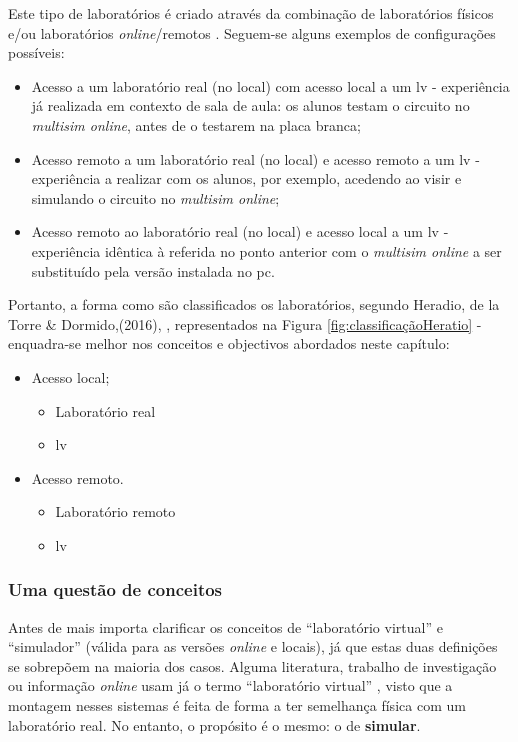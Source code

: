Este tipo de laboratórios é criado através da combinação de laboratórios físicos e/ou laboratórios \textit{online}/remotos \cite{Zapata-Rivera}. Seguem-se alguns exemplos de configurações possíveis:
\begin{itemize}
    \item Acesso a um laboratório real (no local) com acesso local a um \acrfull{lv} - experiência já realizada em contexto de sala de aula: os alunos testam o circuito no \textit{multisim online}, antes de o testarem na placa branca;
    \item Acesso remoto a um laboratório real (no local) e acesso remoto a um \acrshort{lv} - experiência a realizar com os alunos, por exemplo, acedendo ao \acrshort{visir} e simulando o circuito no \textit{multisim online};
    \item Acesso remoto ao laboratório real (no local) e acesso local a um \acrshort{lv} - experiência idêntica à referida no ponto anterior com o \textit{multisim online} a ser substituído pela versão instalada no \acrshort{pc}.
\end{itemize}

Portanto, a forma como são classificados os laboratórios, segundo Heradio, de la Torre \& Dormido,(2016), \cite{HERADIO20161}, representados na Figura \ref{fig:classificaçãoHeratio} - enquadra-se melhor nos conceitos e objectivos abordados neste capítulo:
\begin{itemize}
    \item Acesso local;
    \begin{itemize}
        \item Laboratório real
        \item \acrshort{lv} 
    \end{itemize}
    \item Acesso remoto.
    \begin{itemize}
        \item Laboratório remoto
        \item \acrshort{lv} 
    \end{itemize}
\end{itemize}

\subsubsection{Uma questão de conceitos}
Antes de mais importa clarificar os conceitos de ``laboratório virtual'' e ``simulador'' (válida para as versões \textit{online} e locais), já que estas duas definições se sobrepõem na maioria dos casos. 
Alguma literatura, trabalho de investigação ou informação \textit{online} usam já o termo ``laboratório virtual'' \cite{BRINSON2015218}\cite{virtuallabng}\cite{EMaster2024May}, visto que a montagem nesses sistemas é feita de forma a ter semelhança física com um laboratório real. No entanto, o propósito é o mesmo: o de \textbf{simular}.

